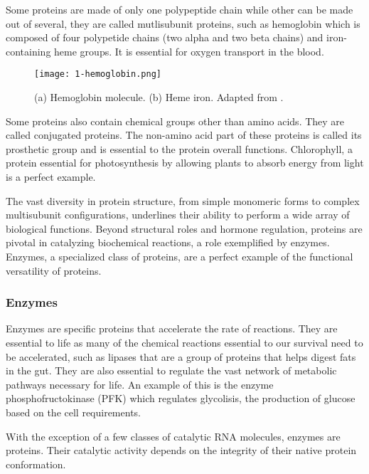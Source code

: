 Some proteins are made of only one polypeptide chain while other can be made out of several, they are 
called mutlisubunit proteins, such as hemoglobin which is composed of four polypetide chains (two alpha
and two beta chains) and iron-containing heme groups. \cite{Perutz1970} 
It is essential for oxygen transport in the blood.

\begin{figure}
  \centering
  \texttt{[image: 1-hemoglobin.png]}
  \caption{(a) Hemoglobin molecule. (b) Heme iron. Adapted from \citeauthor{ALevelBiologyHemoglobin}.}
  \label{fig:hemoglobin}
\end{figure}

Some proteins also contain chemical groups other than amino acids. They are called conjugated proteins.
The non-amino acid part of these proteins is called its prosthetic group and is essential to the protein
overall functions. Chlorophyll, a protein essential for photosynthesis by allowing plants to absorb energy
from light is a perfect example. \cite{Photosynthesis}

The vast diversity in protein structure, from simple monomeric forms to complex multisubunit 
configurations, underlines their ability to perform a wide array of biological functions. 
Beyond structural roles and hormone regulation, proteins are pivotal in catalyzing biochemical 
reactions, a role exemplified by enzymes. Enzymes, a specialized class of proteins, are a perfect example of the 
functional versatility of proteins. 

\subsubsection{Enzymes}
\label{section:enzyme}
Enzymes are specific proteins that accelerate the rate of reactions. They are essential to life as many
of the chemical reactions essential to our survival need to be accelerated, such as lipases that are 
a group of proteins that helps digest fats in the gut. \cite{Pirahanchi2023Lipase} 
They are also essential to regulate the vast network of metabolic pathways necessary for life. An example
of this is the enzyme phosphofructokinase (PFK) which regulates glycolisis, the production of glucose
based on the cell requirements. \cite{Kanai2019Phosphofructokinase}

With the exception of a few classes of catalytic RNA molecules, enzymes are proteins. 
Their catalytic activity depends on the integrity of their native protein conformation. 

